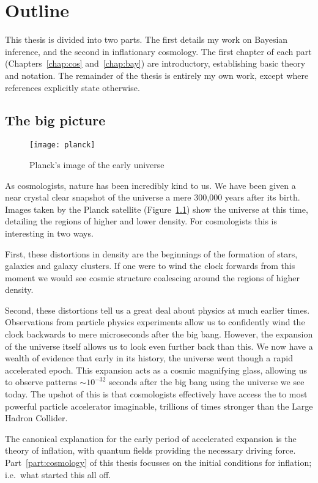 \chapter{Outline}
\label{chap:out}

This thesis is divided into two parts. The first details my work on Bayesian inference, and the second in inflationary cosmology.
The first chapter of each part (Chapters~\ref{chap:cos} and~\ref{chap:bay}) are introductory, establishing basic theory and notation. The remainder of the thesis is entirely my own work, except where references explicitly state otherwise.

\section{The big picture}
\begin{figure}
  \texttt{[image: planck]}
  \caption{Planck's image of the early universe}\label{fig:out:planck}
\end{figure}

As cosmologists, nature has been incredibly kind to us. We have been given a near crystal clear snapshot of the universe a mere 300,000 years after its birth. Images taken by the Planck satellite (Figure~\ref{fig:out:planck}) show the universe at this time, detailing the regions of higher and lower density. For cosmologists this is interesting in two ways. 

First, these distortions in density are the beginnings of the formation of stars, galaxies and galaxy clusters. If one were to wind the clock forwards from this moment we would see cosmic structure coalescing around the regions of higher density.

Second, these distortions tell us a great deal about physics at much earlier times. Observations from particle physics experiments allow us to confidently wind the clock backwards to mere microseconds after the big bang.
However, the expansion of the universe itself allows us to look even further back than this. We now have a wealth of evidence that early in its history, the universe went though a rapid accelerated epoch.  This expansion acts as a cosmic magnifying glass, allowing us to observe patterns $\sim10^{-32}$ seconds after the big bang using the universe we see today. The upshot of this is that cosmologists effectively have access the to most powerful particle accelerator imaginable, trillions of times stronger than the Large Hadron Collider. 

The canonical explanation for the early period of accelerated expansion is the theory of inflation, with quantum fields providing the necessary driving force. Part~\ref{part:cosmology} of this thesis focusses on the initial conditions for inflation; i.e.\ what started this all off.

